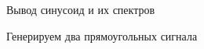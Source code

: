 \documentclass[12pt,a4paper]{scrartcl}
\begin{document}
\begin{figure}[h!]
\caption{Вывод синусоид и их спектров}
\end{figure}
\newpage

\begin{figure}[h!]
\caption{Генерируем два прямоугольных сигнала}
\end{figure}
\newpage
\end{document}
